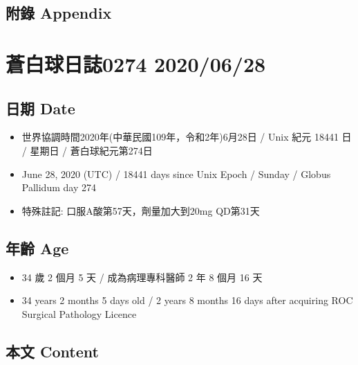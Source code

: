 \documentclass[
]{article}
\providecommand{\tightlist}{%
  \setlength{\itemsep}{0pt}\setlength{\parskip}{0pt}}
\begin{document}
\hypertarget{ux9644ux9304-appendix-22}{%
\subsection{附錄 Appendix}\label{ux9644ux9304-appendix-22}}

\hypertarget{ux84bcux767dux7403ux65e5ux8a8c0274-20200628}{%
\section{蒼白球日誌0274
2020/06/28}\label{ux84bcux767dux7403ux65e5ux8a8c0274-20200628}}

\hypertarget{ux65e5ux671f-date-23}{%
\subsection{日期 Date}\label{ux65e5ux671f-date-23}}

\begin{itemize}
\tightlist
\item
  世界協調時間2020年(中華民國109年，令和2年)6月28日 / Unix 紀元 18441 日
  / 星期日 / 蒼白球紀元第274日
\item
  June 28, 2020 (UTC) / 18441 days since Unix Epoch / Sunday / Globus
  Pallidum day 274
\item
  特殊註記: 口服A酸第57天，劑量加大到20mg QD第31天
\end{itemize}

\hypertarget{ux5e74ux9f61-age-23}{%
\subsection{年齡 Age}\label{ux5e74ux9f61-age-23}}

\begin{itemize}
\tightlist
\item
  34 歲 2 個月 5 天 / 成為病理專科醫師 2 年 8 個月 16 天
\item
  34 years 2 months 5 days old / 2 years 8 months 16 days after
  acquiring ROC Surgical Pathology Licence
\end{itemize}

\hypertarget{ux672cux6587-content-23}{%
\subsection{本文 Content}\label{ux672cux6587-content-23}}
\end{document}
